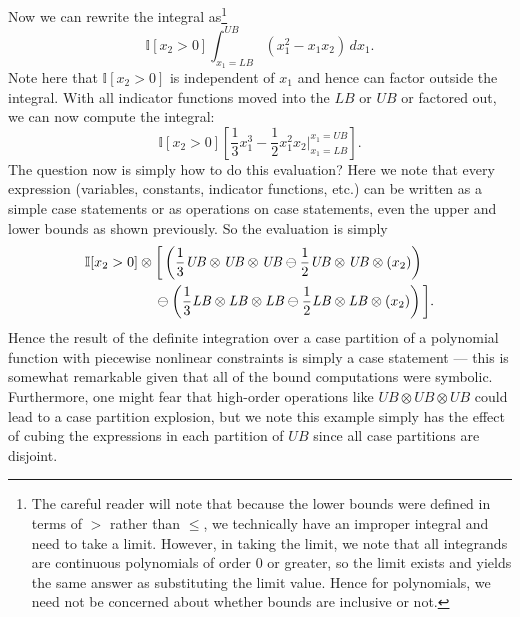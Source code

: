 \documentclass[letterpaper]{article}
\newcommand{\LB}{\mathit{LB}}
\newcommand{\UB}{\mathit{UB}}
\newcommand{\I}{\mathbb{I}}
\begin{document}
Now we can rewrite the integral as\footnote{The careful reader will note
that because the lower bounds were defined in terms of $>$
rather than $\leq$, we technically have an improper integral
and need to take a limit.  However, in taking the limit, we
note that all integrands are continuous polynomials
of order 0 or greater, so the limit exists and yields the
same answer as substituting the limit value.  Hence for 
polynomials, we need not be concerned about whether bounds
are inclusive or not.}
\vspace{-2mm}
\begin{equation}
\I[x_2 > 0] \int_{x_1=\LB}^{\UB} (x_1^2 - x_1 x_2) \, dx_1 .
\end{equation}
Note here that $\I[x_2 > 0]$ is independent of $x_1$ and hence
can factor outside the integral.  With all indicator functions
moved into the $\LB$ or $\UB$ or factored out, we can now compute
the integral:
\vspace{-5mm}
\begin{equation}
\I[x_2 > 0] \left[ \frac{1}{3}x_1^3 - \frac{1}{2}x_1^2 x_2 \bigg|_{x_1=\LB}^{x_1=\UB} \right] .
\end{equation}
The question now is simply how to do this evaluation?  Here we note
that every expression (variables, constants, indicator functions, etc.) 
can be written as a 
simple case statements or as operations on case statements, even the upper
and lower bounds as shown previously.  So the evaluation is simply 
\vspace{-1mm}
{\footnotesize
\begin{align}
\I[x_2 > 0] \otimes \bigg[ & \left( \frac{1}{3} \UB \otimes \UB \otimes \UB \ominus \frac{1}{2} \UB \otimes \UB \otimes (x_2) \right) \nonumber \\
& \hspace{-2mm} \ominus \left( \frac{1}{3} \LB \otimes \LB \otimes \LB \ominus \frac{1}{2} \LB \otimes \LB \otimes (x_2) \right) \bigg] \label{eq:almost_final}.
\end{align}
}
Hence the result of the definite integration over a case
partition of a polynomial function with piecewise nonlinear constraints
is simply a case statement --- this is somewhat remarkable given that
all of the bound computations were symbolic.  Furthermore, one might
fear that high-order operations like $\UB \otimes \UB \otimes \UB$
could lead to a case partition explosion, but we note this example simply
has the effect of cubing the expressions in each partition of $\UB$ since
all case partitions are disjoint.
\end{document}
